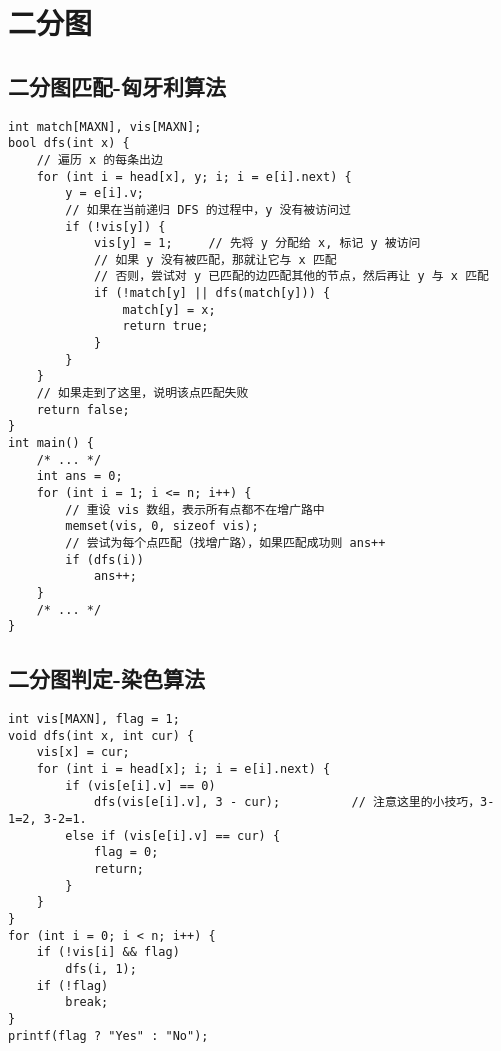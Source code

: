 \section{二分图}
\subsection{二分图匹配-匈牙利算法}
\begin{verbatim}
int match[MAXN], vis[MAXN];
bool dfs(int x) {
    // 遍历 x 的每条出边 
    for (int i = head[x], y; i; i = e[i].next) {
        y = e[i].v;
        // 如果在当前递归 DFS 的过程中，y 没有被访问过 
        if (!vis[y]) {
            vis[y] = 1;     // 先将 y 分配给 x, 标记 y 被访问
            // 如果 y 没有被匹配，那就让它与 x 匹配
            // 否则，尝试对 y 已匹配的边匹配其他的节点，然后再让 y 与 x 匹配 
            if (!match[y] || dfs(match[y])) {
                match[y] = x;
                return true;
            }
        }
    }
    // 如果走到了这里，说明该点匹配失败 
    return false;
}
int main() {
    /* ... */
    int ans = 0;
    for (int i = 1; i <= n; i++) {
        // 重设 vis 数组，表示所有点都不在增广路中 
        memset(vis, 0, sizeof vis);
        // 尝试为每个点匹配（找增广路），如果匹配成功则 ans++ 
        if (dfs(i))
            ans++;
    }
    /* ... */
}
\end{verbatim}

\subsection{二分图判定-染色算法}
\begin{verbatim}
int vis[MAXN], flag = 1;
void dfs(int x, int cur) {
    vis[x] = cur;
    for (int i = head[x]; i; i = e[i].next) {
        if (vis[e[i].v] == 0)
            dfs(vis[e[i].v], 3 - cur);          // 注意这里的小技巧，3-1=2, 3-2=1.
        else if (vis[e[i].v] == cur) {
            flag = 0;
            return;
        }
    }
}
for (int i = 0; i < n; i++) {
    if (!vis[i] && flag)
        dfs(i, 1);
    if (!flag)
        break;
}
printf(flag ? "Yes" : "No");
\end{verbatim}


\clearpage